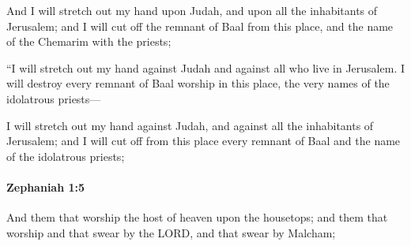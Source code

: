 			\begin{versebox}
					\item[BHS] 
					\item[LXX] 
					\item[ASV] And I will stretch out my hand upon Judah, and upon all the inhabitants of Jerusalem; and I will cut off the remnant of Baal from this place, and the name of the Chemarim with the priests;
					\item[NIV] “I will stretch out my hand against Judah and against all who live in Jerusalem. I will destroy every remnant of Baal worship in this place, the very names of the idolatrous priests—
					\item[NRSV] I will stretch out my hand against Judah, and against all the inhabitants of Jerusalem; and I will cut off from this place every remnant of Baal and the name of the idolatrous priests;
			\end{versebox}

		\paragraph{Zephaniah 1:5} %
			\label{ZEPHANIAH-1-5}

			And them that worship the host of heaven upon the housetops; and them that worship and that swear by the LORD, and that swear by Malcham;

